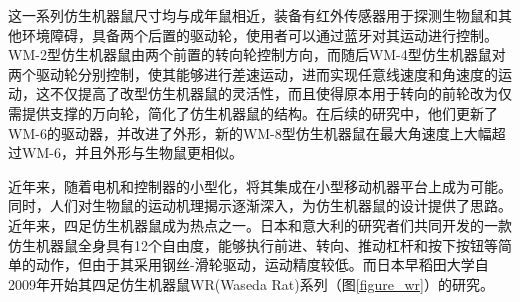 这一系列仿生机器鼠尺寸均与成年鼠相近，装备有红外传感器用于探测生物鼠和其他环境障碍，具备两个后置的驱动轮，使用者可以通过蓝牙对其运动进行控制\cite*{takanishiInteractionCreatureRobot1998, aokiInteractionRatRatrobots1999,  ishiiExperimentalStudyAutomatic2005, ishiiStressExposureUsing2012}。WM-2型仿生机器鼠由两个前置的转向轮控制方向，而随后WM-4型仿生机器鼠对两个驱动轮分别控制，使其能够进行差速运动，进而实现任意线速度和角速度的运动，这不仅提高了改型仿生机器鼠的灵活性，而且使得原本用于转向的前轮改为仅需提供支撑的万向轮，简化了仿生机器鼠的结构\cite{aokiInteractionRatRatrobots1999}。在后续的研究中，他们更新了WM-6的驱动器，并改进了外形，新的WM-8型仿生机器鼠在最大角速度上大幅超过WM-6，并且外形与生物鼠更相似\cite{ishiiStressExposureUsing2012}。

近年来，随着电机和控制器的小型化，将其集成在小型移动机器平台上成为可能。同时，人们对生物鼠的运动机理揭示逐渐深入，为仿生机器鼠的设计提供了思路。近年来，四足仿生机器鼠成为热点之一。日本和意大利的研究者们共同开发的一款仿生机器鼠全身具有12个自由度\cite{laschiDesignDevelopmentLegged2006a}，能够执行前进、转向、推动杠杆和按下按钮等简单的动作，但由于其采用钢丝-滑轮驱动，运动精度较低。而日本早稻田大学自2009年开始其四足仿生机器鼠WR(Waseda Rat)系列（图\ref{figure_wr}）的研究。
